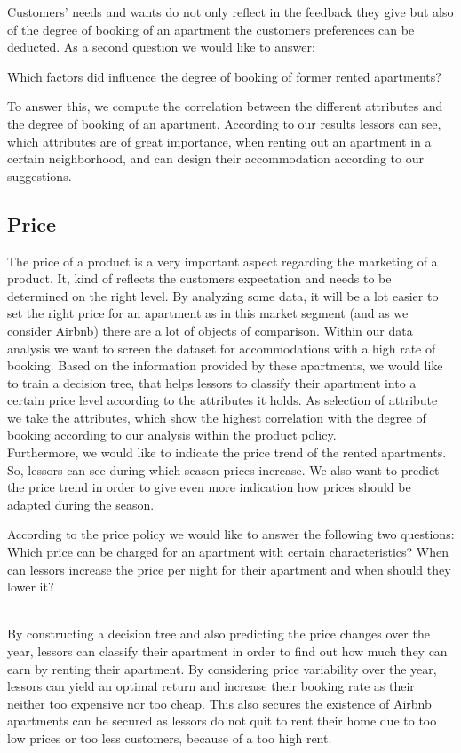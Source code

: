 \documentclass[journal]{IEEEtran}
\begin{document}
Customers’ needs and wants do not only reflect in the feedback they give but also of the degree of booking of an apartment the customers preferences can be deducted. As a second question we would like to answer: \begin{itshape}Which factors did influence the degree of booking of former rented apartments? \end{itshape}To answer this, we compute the correlation between the different attributes and the degree of booking of an apartment. According to our results lessors can see, which attributes are of great importance, when renting out an apartment in a certain neighborhood, and can design their accommodation according to our suggestions. 

\subsection{Price}
\noindent The price of a product is a very important aspect regarding the marketing of a product. It, kind of reflects the customers expectation and needs to be determined on the right level. By analyzing some data, it will be a lot easier to set the right price for an apartment as in this market segment (and as we consider Airbnb) there are a lot of objects of comparison. Within our data analysis we want to screen the dataset for accommodations with a high rate of booking. Based on the information provided by these apartments, we would like to train a decision tree, that helps lessors to classify their apartment into a certain price level according to the attributes it holds. As selection of attribute we take the attributes, which show the highest correlation with the degree of booking according to our analysis within the product policy.\\ Furthermore, we would like to indicate the price trend of the rented apartments. So, lessors can see during which season prices increase. We also want to predict the price trend in order to give even more indication how prices should be adapted during the season.\\
\begin{itshape}
According to the price policy we would like to answer the following two questions: Which price can be charged for an apartment with certain characteristics? When can lessors increase the price per night for their apartment and when should they lower it?
\end{itshape}
\\By constructing a decision tree and also predicting the price changes over the year, lessors can classify their apartment in order to find out how much they can earn by renting their apartment. By considering price variability over the year, lessors can yield an optimal return and increase their booking rate as their neither too expensive nor too cheap. This also secures the existence of Airbnb apartments can be secured as lessors do not quit to rent their home due to too low prices or too less customers, because of a too high rent.
\end{document}
